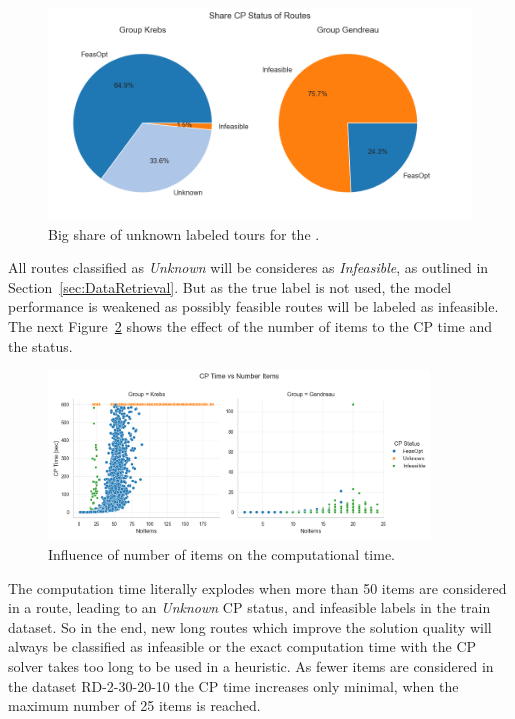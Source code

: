 \begin{figure}[ht]
    \centering
    \includegraphics[width=\textwidth]{pictures/comparison_krebs_gendreau/pie_chart_share_cp_status.png}
    \caption{Big share of unknown labeled tours for the \krebsADataSet.}
    \label{fig:comparison_krebs_gendreau_piechart}
\end{figure}
All routes classified as \textit{Unknown} will be consideres as \textit{Infeasible}, as outlined in Section~\ref{sec:DataRetrieval}. But
as the true label is not used, the model performance is weakened as possibly feasible routes will be labeled as infeasible. The
next Figure~\ref{fig:comparison_krebs_gendreau_numberItems} shows the effect of the number of items to the \gls{CP} time and the status.

\begin{figure}[ht]
    \centering
    \includegraphics[width=0.9\textwidth]{pictures/comparison_krebs_gendreau/number_items_cp_status.png}
    \caption{Influence of number of items on the computational time.}
    \label{fig:comparison_krebs_gendreau_numberItems}
\end{figure}

The computation time literally explodes when more than 50 items are considered in a route, leading to an \textit{Unknown} \gls{CP} status, and
infeasible labels in the train dataset. So in the end, new long routes which improve the solution quality will always be classified as infeasible
or the exact computation time with the \gls{CP} solver takes too long to be used in a heuristic. As fewer items are considered in the dataset
RD-2-30-20-10 the \gls{CP} time increases only minimal, when the maximum number of 25 items is reached.

